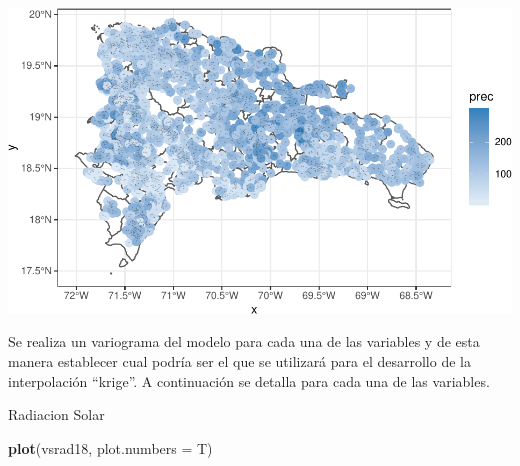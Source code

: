 \documentclass[11pt,]{article}
\newenvironment{Shaded}{\begin{snugshade}}{\end{snugshade}}
\newcommand{\KeywordTok}[1]{\textcolor[rgb]{0.13,0.29,0.53}{\textbf{#1}}}
\newcommand{\DataTypeTok}[1]{\textcolor[rgb]{0.13,0.29,0.53}{#1}}
\newcommand{\DecValTok}[1]{\textcolor[rgb]{0.00,0.00,0.81}{#1}}
\newcommand{\FloatTok}[1]{\textcolor[rgb]{0.00,0.00,0.81}{#1}}
\newcommand{\StringTok}[1]{\textcolor[rgb]{0.31,0.60,0.02}{#1}}
\newcommand{\OperatorTok}[1]{\textcolor[rgb]{0.81,0.36,0.00}{\textbf{#1}}}
\newcommand{\NormalTok}[1]{#1}
\begin{document}
\begin{Shaded}
\end{Shaded}

\includegraphics{proyecto_files/figure-latex/unnamed-chunk-36-5.pdf}

Se realiza un variograma del modelo para cada una de las variables y de
esta manera establecer cual podría ser el que se utilizará para el
desarrollo de la interpolación ``krige''. A continuación se detalla para
cada una de las variables.

Radiacion Solar

\begin{Shaded}
\begin{Highlighting}[]
\KeywordTok{plot}\NormalTok{(vsrad18, }\DataTypeTok{plot.numbers =}\NormalTok{ T)}
\end{Highlighting}
\end{Shaded}
\end{document}
